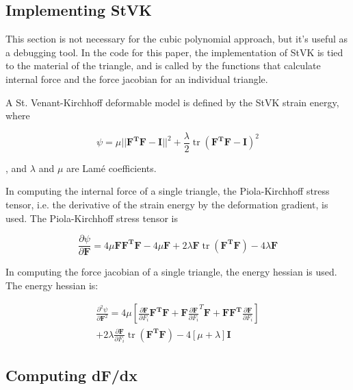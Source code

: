 \documentclass[twocolumn,10pt]{asme2ej}
\DeclareMathOperator{\tr}{tr}
\begin{document}
\subsection{Implementing StVK}

This section is not necessary for the cubic polynomial approach, but it's useful as a debugging tool. In the code
for this paper, the implementation of StVK is tied to the material of the triangle, and is called by the functions
that calculate internal force and the force jacobian for an individual triangle.

A St. Venant-Kirchhoff deformable model is defined by the StVK strain energy, where

\begin{equation}
\psi = \mu ||\bm{F^TF} - \bm{I}||^2 + \frac{\lambda}{2}\tr (\bm{F^TF} - \bm{I})^2
\label{eq_stvk}
\end{equation}

, and $\lambda$ and $\mu$ are Lamé coefficients.

In computing the internal force of a single triangle, the Piola-Kirchhoff stress tensor, i.e. the derivative of the strain energy by the deformation gradient, is used. The Piola-Kirchhoff stress tensor is

\begin{equation}
\frac{\partial \psi}{\partial \bm{F}} = 4\mu \bm{FF^TF} - 4\mu \bm{F} + 2\lambda \bm{F}\tr (\bm{F^TF}) -4\lambda \bm{F}
\label{eq_pk1}
\end{equation}

In computing the force jacobian of a single triangle, the energy hessian is used. The energy hessian is:

\begin{equation}
  \begin{split}
\frac{\partial^2 \psi}{\partial \bm{F}^2} = 4\mu \left[\frac{\partial \bm{F}}{\partial F_i}\bm{F^TF} + \bm{F}\frac{\partial \bm{F}}{\partial F_i}^T\bm{F} + \bm{FF^T}\frac{\partial \bm{F}}{\partial F_i}\right] \\ + 2\lambda \frac{\partial \bm{F}}{\partial F_i}\tr \left(\bm{F^TF}\right) - 4[\mu + \lambda]\bm{I}
  \end{split}
\label{eq_dpdf}
\end{equation}

\subsection{Computing dF/dx}
\end{document}
